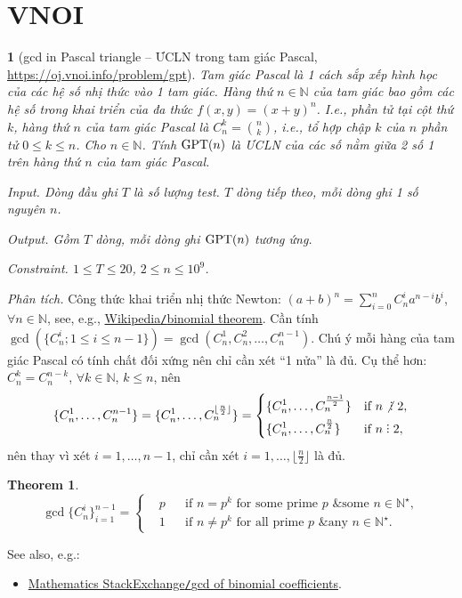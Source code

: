 \documentclass{article}
\newtheorem{baitoan}{}
\newtheorem{theorem}{Theorem}
\DeclareRobustCommand{\divby}{%
	\mathrel{\vbox{\baselineskip.65ex\lineskiplimit0pt\hbox{.}\hbox{.}\hbox{.}}}%
}
\begin{document}

\section{VNOI}

\begin{baitoan}[gcd in Pascal triangle -- ƯCLN trong tam giác Pascal, \url{https://oj.vnoi.info/problem/gpt}]
	Tam giác Pascal là 1 cách sắp xếp hình học của các hệ số nhị thức vào 1 tam giác. Hàng thứ $n\in\mathbb{N}$ của tam giác bao gồm các hệ số trong khai triển của đa thức $f(x,y) = (x + y)^n$. I.e., phần tử tại cột thứ $k$, hàng thứ $n$ của tam giác Pascal là $C_n^k = \binom{n}{k}$, i.e., tổ hợp chập $k$ của $n$ phần tử $0\le k\le n$. Cho $n\in\mathbb{N}$. Tính ${\rm GPT}(n)$ là ƯCLN của các số nằm giữa 2 số 1 trên hàng thứ $n$ của tam giác Pascal.
	\item {\sf Input.} Dòng đầu ghi $T$ là số lượng test. $T$ dòng tiếp theo, mỗi dòng ghi 1 số nguyên $n$.
	\item {\sf Output.} Gồm $T$ dòng, mỗi dòng ghi ${\rm GPT}(n)$ tương ứng.
	\item {\sf Constraint.} $1\le T\le20$, $2\le n\le10^9$.
\end{baitoan}
{\it Phân tích.} Công thức khai triển nhị thức Newton: $(a + b)^n = \sum_{i=0}^n C_n^ia^{n-i}b^i$, $\forall n\in\mathbb{N}$, see, e.g., \href{https://en.wikipedia.org/wiki/Binomial_theorem}{Wikipedia{\tt/}binomial theorem}. Cần tính $\gcd(\{C_n^i;1\le i\le n - 1\}) = \gcd(C_n^1,C_n^2,\ldots,C_n^{n-1})$. Chú ý mỗi hàng của tam giác Pascal có tính chất đối xứng nên chỉ cần xét ``1 nửa'' là đủ. Cụ thể hơn: $C_n^k = C_n^{n-k}$, $\forall k\in\mathbb{N}$, $k\le n$, nên
\begin{equation*}
	\{C_n^1,\ldots,C_n^{n-1}\} = \{C_n^1,\ldots,C_n^{\lfloor\frac{n}{2}\rfloor}\} = \left\{\begin{split}
		&\{C_n^1,\ldots,C_n^{\frac{n-1}{2}}\}&&\mbox{if } n\not{\divby}\ 2,\\
		&\{C_n^1,\ldots,C_n^{\frac{n}{2}}\}&&\mbox{if } n\divby2,
	\end{split}\right.
\end{equation*}
nên thay vì xét $i = 1,\ldots,n-1$, chỉ cần xét $i = 1,\ldots,\lfloor\frac{n}{2}\rfloor$ là đủ.

\begin{theorem}
	\begin{equation*}
		\gcd\{C_n^i\}_{i=1}^{n-1} = \left\{\begin{split}
			&p&&\mbox{if } n = p^k\mbox{ for some prime } p\mbox{ \& some } n\in\mathbb{N}^\star,\\
			&1&&\mbox{if } n\ne p^k\mbox{ for all prime } p\mbox{ \& any } n\in\mathbb{N}^\star.
		\end{split}\right.
	\end{equation*}
\end{theorem}
See also, e.g.:
\begin{itemize}
	\item \href{https://math.stackexchange.com/questions/2067235/gcd-of-binomial-coefficients}{Mathematics StackExchange{\tt/}gcd of binomial coefficients}.
\end{itemize}
\end{document}
